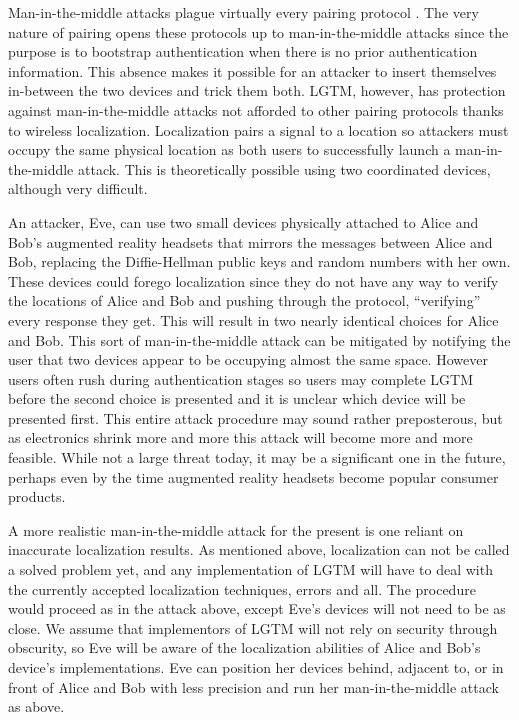 \documentclass[12pt]{report}
\begin{document}
Man-in-the-middle attacks plague virtually every pairing protocol \cite{ConferenceCompStudySecurePairingKumar2009}. The very nature of pairing opens these protocols up to man-in-the-middle attacks since the purpose is to bootstrap authentication when there is no prior authentication information. This absence makes it possible for an attacker to insert themselves in-between the two devices and trick them both. LGTM, however, has protection against man-in-the-middle attacks not afforded to other pairing protocols thanks to wireless localization. Localization pairs a signal to a location so attackers must occupy the same physical location as both users to successfully launch a man-in-the-middle attack. This is theoretically possible using two coordinated devices, although very difficult. \par

An attacker, Eve, can use two small devices physically attached to Alice and Bob's augmented reality headsets that mirrors the messages between Alice and Bob, replacing the Diffie-Hellman public keys and random numbers with her own. These devices could forego localization since they do not have any way to verify the locations of Alice and Bob and pushing through the protocol, ``verifying'' every response they get. This will result in two nearly identical choices for Alice and Bob. This sort of man-in-the-middle attack can be mitigated by notifying the user that two devices appear to be occupying almost the same space. However users often rush during authentication stages \cite{PairingInterfaceConstrainedRushingSaxena2009} so users may complete LGTM before the second choice is presented and it is unclear which device will be presented first. This entire attack procedure may sound rather preposterous, but as electronics shrink more and more this attack will become more and more feasible. While not a large threat today, it may be a significant one in the future, perhaps even by the time augmented reality headsets become popular consumer products. \par

A more realistic man-in-the-middle attack for the present is one reliant on inaccurate localization results. As mentioned above, localization can not be called a solved problem yet, and any implementation of LGTM will have to deal with the currently accepted localization techniques, errors and all. The procedure would proceed as in the attack above, except Eve's devices will not need to be as close. We assume that implementors of LGTM will not rely on security through obscurity, so Eve will be aware of the localization abilities of Alice and Bob's device's implementations. Eve can position her devices behind, adjacent to, or in front of Alice and Bob with less precision and run her man-in-the-middle attack as above. \par
\end{document}
